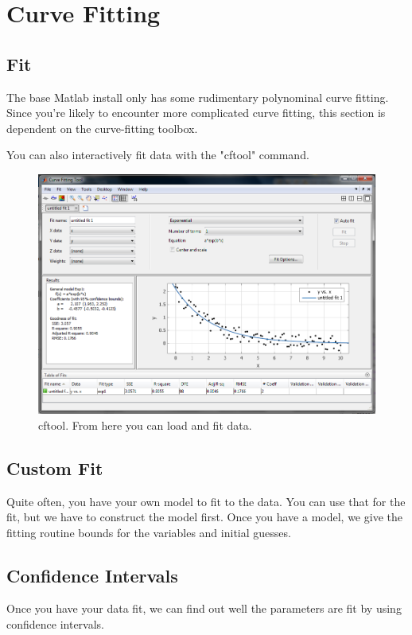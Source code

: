 
\pagebreak
\section{Curve Fitting}

\subsection{Fit}
The base Matlab install only has some rudimentary polynominal curve fitting.
 Since you're likely to encounter more complicated curve fitting, this section is dependent on the curve-fitting toolbox.

\begin{quote}

\end{quote}

\pagebreak
You can also interactively fit data with the "cftool" command.

\begin{figure}[ht!]
\centering
\includegraphics[width=120mm]{img/cftool.png}
\caption{cftool. From here you can load and fit data.}
\label{guiload}
\end{figure}

\pagebreak
\subsection{Custom Fit}
Quite often, you have your own model to fit to the data.
 You can use that for the fit, but we have to construct the model first.
 Once you have a model, we give the fitting routine bounds for the variables and initial guesses.

\begin{quote}
 
\end{quote}

\pagebreak
\subsection{Confidence Intervals}
Once you have your data fit, we can find out well the parameters are fit by using confidence intervals.

\begin{quote}
 
\end{quote}
